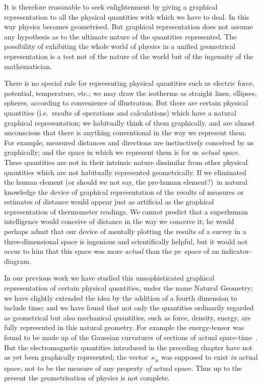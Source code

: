 \documentclass[12pt]{book}
\begin{document}
It is therefore reasonable to seek enlightenment by giving a graphical
representation to all the physical quantities with which we have to deal. In
this way physics becomes geometrised. But graphical representation does not
assume any hypothesis as to the ultimate nature of the quantities represented.
The possibility of exhibiting the whole world of physics in a unified geometrical
representation is a test not of the nature of the world but of the ingenuity of
the mathematician.

There is no special rule for representing physical quantities such as electric
force, potential, temperature, etc.; we may draw the isotherms as straight
lines, ellipses, spheres, according to convenience of illustration. But there are
certain physical quantities (i.e.\ results of operations and calculations) which
have a natural graphical representation; we habitually think of them graphically,
and are almost unconscious that there is anything conventional in the
way we represent them. For example, measured distances and directions are
instinctively conceived by us graphically; and the space in which we represent
them is for us \emph{actual space}. These quantities are not in their intrinsic
nature dissimilar from other physical quantities which are not habitually represented
geometrically. If we eliminated the human element (or should we not
say, the pre-human element?)\ in natural knowledge the device of graphical
representation of the results of measures or estimates of distance would appear
just as artificial as the graphical representation of thermometer readings. We
cannot predict that a superhuman intelligence would conceive of distance in
the way we conceive it; he would perhaps admit that our device of mentally
plotting the results of a survey in a three-dimensional space is ingenious and
scientifically helpful, but it would not occur to him that this space was more
\emph{actual} than the $pv$~space of an indicator-diagram.

In our previous work we have studied this unsophisticated graphical representation
of certain physical quantities, under the name Natural Geometry;
we have slightly extended the idea by the addition of a fourth dimension to
include time; and we have found that not only the quantities ordinarily
regarded as geometrical but also mechanical quantities, such as force, density,
energy, are fully represented in this natural geometry. For example the energy-tensor
was found to be made up of the Gaussian curvatures of sections of actual
space-time~. But the electromagnetic quantities introduced in the preceding
chapter have not as yet been graphically represented; the vector~$\kappa_{\mu}$ was
supposed to exist \emph{in} actual space, not to be the measure of any property \emph{of} actual
space. Thus up to the present the geometrisation of physics is not complete.
\end{document}
